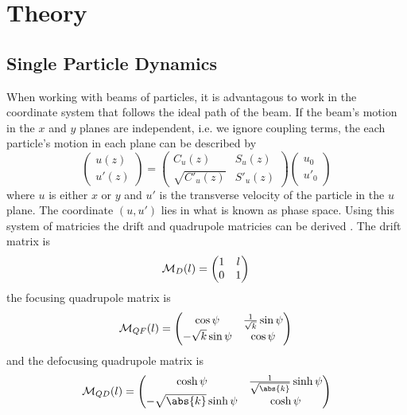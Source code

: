
\section{Theory}

\subsection{Single Particle Dynamics}

When working with beams of particles, it is advantagous to work in the
coordinate system that follows the ideal path of the beam. If the beam's motion
in the \(x\) and \(y\) planes are independent, i.e. we ignore coupling terms,
the each particle's motion in each plane can be described by
\begin{equation}
	\begin{pmatrix}
		u(z) \\ u'(z)
	\end{pmatrix}
	=
	\begin{pmatrix}
		C_u(z)  & S_u(z)  \\
		\sqrt{C'_u(z)} & S'_u(z)
	\end{pmatrix}
	\begin{pmatrix}
		u_0 \\ u'_0
	\end{pmatrix}
\end{equation}
where \(u\) is either \(x\) or \(y\) and \(u'\) is the transverse velocity of
the particle in the \(u\) plane. The coordinate \((u, u')\) lies in what is
known as phase space. Using this system of matricies the drift and quadrupole
matricies can be derived \cite{wiedemann2007particle}. The drift matrix is
\begin{equation}
	\mathcal{M}_D(l) =
	\begin{pmatrix}
		1 & l \\
		0 & 1
	\end{pmatrix} \\
\end{equation}
the focusing quadrupole matrix is
\begin{equation}
	\mathcal{M}_{QF}(l) =
	\begin{pmatrix}
		\cos\psi & \frac{1}{\sqrt{k}}\sin\psi \\
		-\sqrt{k}\sin\psi & \cos\psi
	\end{pmatrix} \\
\end{equation}
and the defocusing quadrupole matrix is
\begin{equation}
	\mathcal{M}_{QD}(l) =
	\begin{pmatrix}
		\cosh\psi & \frac{1}{\sqrt{\abs{k}}}\sinh\psi \\
		-\sqrt{\abs{k}}\sinh\psi & \cosh\psi
	\end{pmatrix}
\end{equation}

